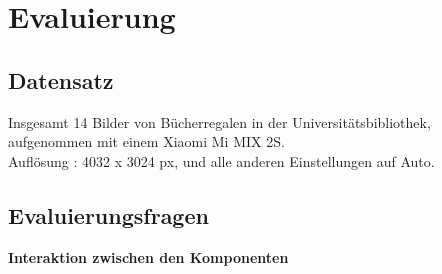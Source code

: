 \documentclass[paper=A4, deutsch]{scrartcl}
\begin{document}
\section{Evaluierung}
\subsection{Datensatz}
Insgesamt 14 Bilder von Bücherregalen in der Universitätsbibliothek, aufgenommen mit einem Xiaomi Mi MIX 2S.\\Auflösung : 4032 x 3024 px, und alle anderen Einstellungen auf Auto.
\subsection{Evaluierungsfragen}
\textbf{Interaktion zwischen den Komponenten}
\end{document}
